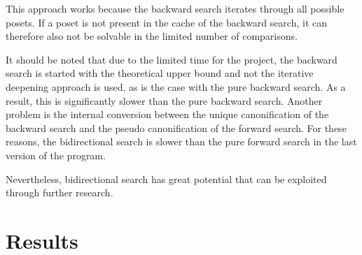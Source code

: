 \documentclass[twoside,leqno,twocolumn]{article}
\begin{document}
This approach works because the backward search iterates through all possible posets.
If a poset is not present in the cache of the backward search, it can therefore also not be solvable in the limited number of comparisons.

It should be noted that due to the limited time for the project, the backward search is started with the theoretical upper bound and not the iterative deepening approach is used, as is the case with the pure backward search. %
As a result, this is significantly slower than the pure backward search.
Another problem is the internal conversion between the unique canonification of the backward search and the pseudo canonification of the forward search.
For these reasons, the bidirectional search is slower than the pure forward search in the last version of the program.

Nevertheless, bidirectional search has great potential that can be exploited through further research.


\section{Results}

\end{document}

